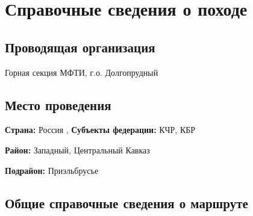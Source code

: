 \section{Справочные сведения о походе} 
\subsection{Проводящая организация}
Горная секция МФТИ, г.о. Долгопрудный


\subsection{Место проведения}
\textbf{Страна:} Россия
,
\textbf{Субъекты федерации:} КЧР, КБР

\textbf{Район:} Западный, Центральный Кавказ

\textbf{Подрайон:} Приэльбрусье


\subsection{Общие справочные сведения о маршруте}


